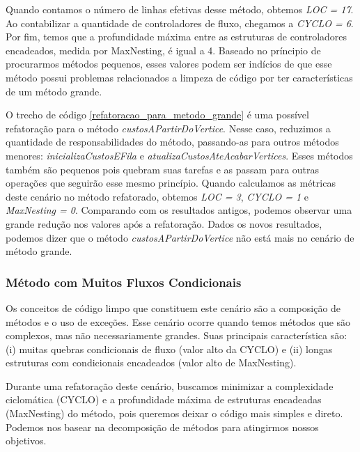 Quando contamos o número de linhas efetivas desse método, obtemos \textit{LOC = 17}. Ao contabilizar a quantidade de controladores de fluxo, chegamos a \textit{CYCLO = 6}. Por fim, temos que a profundidade máxima entre as estruturas de controladores encadeados, medida por MaxNesting, é igual a 4. Baseado no príncipio de procurarmos métodos pequenos, esses valores podem ser indícios de que esse método possui problemas relacionados a limpeza de código por ter características de um método grande.
                                                      
O trecho de código \ref{refatoracao_para_metodo_grande} é uma possível refatoração para o método \textit{custosAPartirDoVertice}. Nesse caso, reduzimos a quantidade de responsabilidades do método, passando-as para outros métodos menores: \textit{inicializaCustosEFila} e \textit{atualizaCustosAteAcabarVertices}. Esses métodos também são pequenos pois quebram suas tarefas e as passam para outras operações que seguirão esse mesmo princípio. Quando calculamos as métricas deste cenário no método refatorado, obtemos \textit{LOC = 3}, \textit{CYCLO = 1} e \textit{MaxNesting = 0}. Comparando com os resultados antigos, podemos observar uma grande redução nos valores após a refatoração. Dados os novos resultados, podemos dizer que o método \textit{custosAPartirDoVertice} não está mais no cenário de método grande.

                                                            

	
\subsubsection{Método com Muitos Fluxos Condicionais}
                  
Os conceitos de código limpo que constituem este cenário são a composição de métodos e o uso de exceções. Esse cenário ocorre quando temos métodos que são complexos, mas não necessariamente grandes. Suas principais característica são: (i) muitas quebras condicionais de fluxo (valor alto da CYCLO) e (ii) longas estruturas com condicionais encadeados (valor alto de MaxNesting).
                                                                                 
Durante uma refatoração deste cenário, buscamos minimizar a complexidade ciclomática (CYCLO) e a profundidade máxima de estruturas encadeadas (MaxNesting) do método, pois queremos deixar o código mais simples e direto. Podemos nos basear na decomposição de métodos para atingirmos nossos objetivos.
	
